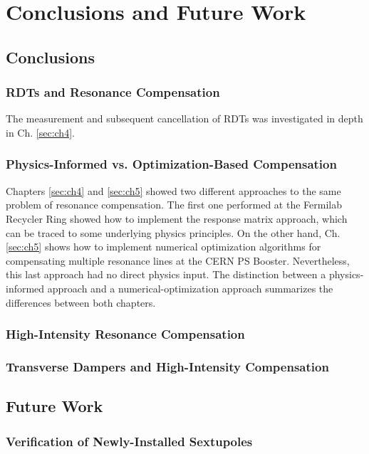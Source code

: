 \chapter{Conclusions and Future Work}
\label{sec:ch7}

\section{Conclusions}

\subsection{RDTs and Resonance Compensation}

The measurement and subsequent cancellation of RDTs was investigated in depth in Ch. \ref{sec:ch4}.

\subsection{Physics-Informed vs. Optimization-Based Compensation}

Chapters \ref{sec:ch4} and \ref{sec:ch5} showed two different approaches to the same problem of resonance compensation. The first one performed at the Fermilab Recycler Ring showed how to implement the response matrix approach, which can be traced to some underlying physics principles. On the other hand, Ch. \ref{sec:ch5} shows how to implement numerical optimization algorithms for compensating multiple resonance lines at the CERN PS Booster. Nevertheless, this last approach had no direct physics input. The distinction between a physics-informed approach and a numerical-optimization approach summarizes the differences between both chapters. 

\subsection{High-Intensity Resonance Compensation}

\subsection{Transverse Dampers and High-Intensity Compensation}

\section{Future Work}

\subsection{Verification of Newly-Installed Sextupoles}

